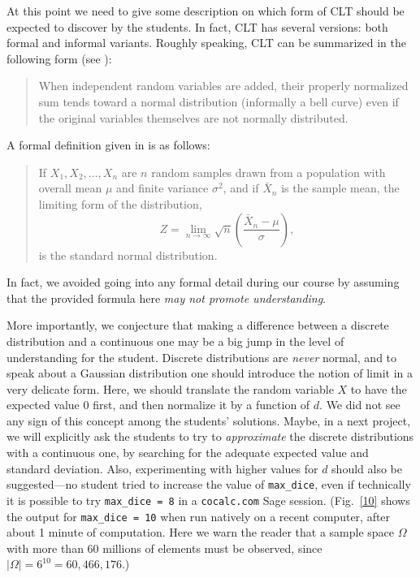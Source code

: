\documentclass[]{interact}
\theoremstyle{plain}%
\theoremstyle{definition}
\theoremstyle{remark}
\begin{document}
At this point we need to give some description on which form of CLT should be expected to discover by the students.
In fact, CLT has several versions: both formal and informal variants. Roughly speaking, CLT can be summarized
in the following form (see \cite{Wikipedia-CLT}):
\begin{quote}
When independent random variables are added, their properly normalized
sum tends toward a normal distribution (informally a bell curve) even if
the original variables themselves are not normally distributed.
\end{quote}
A formal definition given in \cite[p.~241]{Montgomery2014} is as follows:
\begin{quote}
If $X_{1},X_{2},\ldots,X_{n}$
are $n$ random samples drawn from a population
with overall mean $\mu$ and finite variance $\sigma^2$,
and if ${\bar {X}}_{n}$ is the sample mean, the
limiting form of the distribution, $$Z=\lim _{n\to \infty}{\sqrt {n}}{\left({\frac {{\bar {X}}_{n}-\mu }
{\sigma}}\right)},$$ is the standard normal
distribution.
\end{quote}
In fact, we avoided going into any formal detail during our course by assuming that the provided formula
here \textit{may not promote understanding}.

More importantly, we conjecture that making a difference between a discrete distribution and a continuous one may be
a big jump in the level of understanding for the student. Discrete distributions are \textit{never} normal,
and to speak about a Gaussian distribution one should introduce the notion of limit in a very
delicate form. Here, we should translate the random variable $X$ to have the expected value $0$ first,
and then normalize it by a function of $d$. We did not see any sign of this concept among the
students' solutions. Maybe, in a next project, we will explicitly ask the students to try to
\textit{approximate} the discrete distributions with a continuous one, by searching for the adequate
expected value and standard deviation. Also, experimenting with higher values for $d$ should also be
suggested---no student
tried to increase the value of \texttt{max\_dice}, even if technically it is possible to try
\texttt{max\_dice = 8} in a \texttt{cocalc.com} Sage session. (Fig.~\ref{10} shows the output
for \texttt{max\_dice = 10} when run natively on a recent computer, after about 1 minute
of computation. Here we warn the reader that a sample space $\Omega$ with more than 60 millions of elements
must be observed, since $|\Omega|=6^{10}=60,466,176$.)
\end{document}
